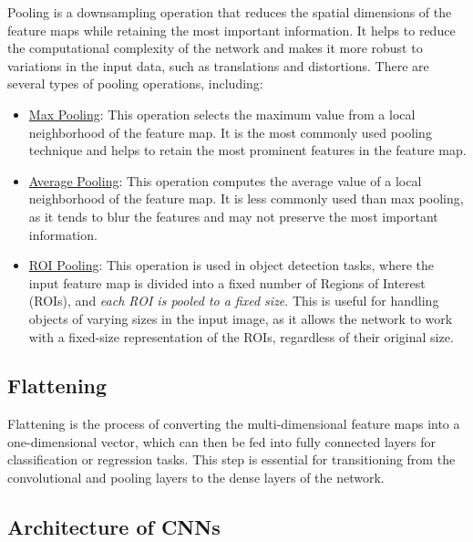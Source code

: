 Pooling is a downsampling operation that reduces the spatial dimensions of the feature maps while retaining the most important information. It helps to reduce the computational complexity of the network and makes it more robust to variations in the input data, such as translations and distortions. There are several types of pooling operations, including:
\begin{itemize}
    \item \ul{Max Pooling}: This operation selects the maximum value from a local neighborhood of the feature map. It is the most commonly used pooling technique and helps to retain the most prominent features in the feature map.
    \item \ul{Average Pooling}: This operation computes the average value of a local neighborhood of the feature map. It is less commonly used than max pooling, as it tends to blur the features and may not preserve the most important information.
    \item \ul{ROI Pooling}: This operation is used in object detection tasks, where the input feature map is divided into a fixed number of Regions of Interest (ROIs), and \emph{each ROI is pooled to a fixed size}. This is useful for handling objects of varying sizes in the input image, as it allows the network to work with a fixed-size representation of the ROIs, regardless of their original size.
\end{itemize}

\subsection{Flattening}

Flattening is the process of converting the multi-dimensional feature maps into a one-dimensional vector, which can then be fed into fully connected layers for classification or regression tasks. This step is essential for transitioning from the convolutional and pooling layers to the dense layers of the network.

\subsection{Architecture of CNNs}

